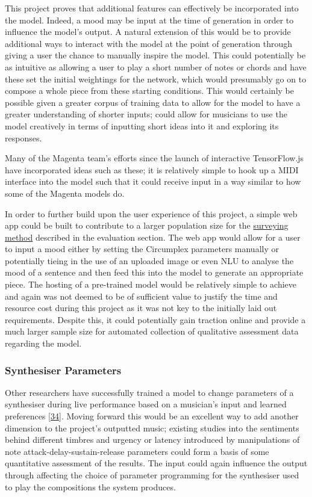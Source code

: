 \documentclass[12pt,]{article}
\begin{document}
This project proves that additional features can effectively be
incorporated into the model. Indeed, a mood may be input at the time of
generation in order to influence the model's output. A natural extension
of this would be to provide additional ways to interact with the model
at the point of generation through giving a user the chance to manually
inspire the model. This could potentially be as intuitive as allowing a
user to play a short number of notes or chords and have these set the
initial weightings for the network, which would presumably go on to
compose a whole piece from these starting conditions. This would
certainly be possible given a greater corpus of training data to allow
for the model to have a greater understanding of shorter inputs; could
allow for musicians to use the model creatively in terms of inputting
short ideas into it and exploring its responses.

Many of the Magenta team's efforts since the launch of interactive
TensorFlow.js have incorporated ideas such as these; it is relatively
simple to hook up a MIDI interface into the model such that it could
receive input in a way similar to how some of the Magenta models do.

In order to further build upon the user experience of this project, a
simple web app could be built to contribute to a larger population size
for the \protect\hyperlink{qualitativesurveryingmethod}{surveying
method} described in the evaluation section. The web app would allow for
a user to input a mood either by setting the Circumplex parameters
manually or potentially tieing in the use of an uploaded image or even
NLU to analyse the mood of a sentence and then feed this into the model
to generate an appropriate piece. The hosting of a pre-trained model
would be relatively simple to achieve and again was not deemed to be of
sufficient value to justify the time and resource cost during this
project as it was not key to the initially laid out requirements.
Despite this, it could potentially gain traction online and provide a
much larger sample size for automated collection of qualitative
assessment data regarding the model.

\hypertarget{synthesiser-parameters}{%
\subsubsection{Synthesiser Parameters}\label{synthesiser-parameters}}

Other researchers have successfully trained a model to change parameters
of a synthesiser during live performance based on a musician's input and
learned preferences {[}\protect\hyperlink{ref-sommer2014towards}{34}{]}.
Moving forward this would be an excellent way to add another dimension
to the project's outputted music; existing studies into the sentiments
behind different timbres and urgency or latency introduced by
manipulations of note attack-delay-sustain-release parameters could form
a basis of some quantitative assessment of the results. The input could
again influence the output through affecting the choice of parameter
programming for the synthesiser used to play the compositions the system
produces.
\end{document}
